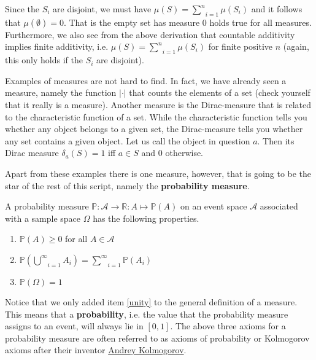 \documentclass[a4paper,11pt,leqno]{report}
\begin{document}
Since the $ S_{i} $ are disjoint, we
must have $ \mu(S) = \underset{i=1}{\overset{n}{\sum}} \mu (S_{i}) $ and it follows that 
$ \mu(\emptyset) = 0 $.
That is the empty set has measure $ 0 $ holds true for all measures. Furthermore, we also see from the above
derivation that countable additivity implies finite additivity, i.e.
$ \mu(S) = \underset{i=1}{\overset{n}{\sum}} \mu(S_{i}) $ for finite positive $ n $ (again, this only
holds if the $ S_{i} $ are disjoint).

Examples of measures are not hard to find. In fact, we have already seen a measure,
namely the function $ |\cdot| $ that counts the elements of a set (check yourself that it really is a 
measure). Another measure is the Dirac-measure that is related to the characteristic
function of a set. While the characteristic function tells you whether any object belongs to a given set,
the Dirac-measure tells you whether any set contains a given object. Let us call the object in question
$ a $. Then its Dirac measure $ \delta_{a}(S) = 1 $ iff $ a \in S $ and 0 otherwise. 

Apart from these examples there is one measure, however, that is going to be the star of the rest of this 
script, namely the \textbf{probability measure}.

\begin{Definition}
A probability measure $ \mathbb{P}: \mathcal{A} \rightarrow \mathbb{R} : A \mapsto \mathbb{P}(A) $
on an event space $ \mathcal{A} $ associated with a sample space $ \Omega $ has the
following properties.
\begin{enumerate}
\item $ \mathbb{P}(A) \geq 0 $ for all $ A \in \mathcal{A} $
\item $ \mathbb{P}\left( \underset{i = 1}{\overset{\infty}{\bigcup}} A_{i} \right)
= \underset{i = 1}{\overset{\infty}{\sum}} \mathbb{P} \left( A_{i} \right) $ \label{union}
\item $ \mathbb{P}(\Omega) = 1 $ \label{unity}
\end{enumerate}
\end{Definition}

Notice that we only added item \ref{unity} to the general definition of a measure. This means that a
\textbf{probability}, i.e. the value that the probability measure assigns to an event, will always lie in
$ [0,1] $. The above three axioms for a probability measure are often referred to as axioms of probability
or Kolmogorov axioms after their inventor \href{https://en.wikipedia.org/wiki/Andrey_Kolmogorov}{Andrey
Kolmogorov}.
\end{document}
